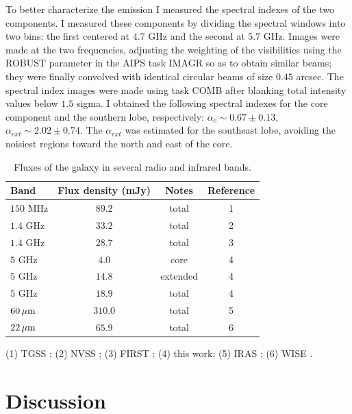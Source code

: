 \documentclass[../main.tex]{subfiles}
\begin{document}
To better characterize the emission I measured the spectral indexes of the two components.
I measured these components by dividing the spectral windows into two bins: the first centered at $4.7$ GHz and the second at $5.7$ GHz.
Images were made at the two frequencies, adjusting the weighting of the visibilities using the ROBUST parameter in the AIPS task IMAGR so as to obtain similar beams; they were finally convolved with identical circular beams of size $0.45$ arcsec. 
The spectral index images were made using task COMB after blanking total intensity values below $1.5$ sigma. 
I obtained the following spectral indexes for the core component and the southern lobe, respectively:  $\alpha_{c} \sim 0.67\pm0.13$,  $\alpha_{ext} \sim 2.02\pm0.74$. 
The $\alpha_{ext}$ was estimated for the southeast lobe, avoiding the noisiest regions toward the north and east of the core.


\begin{table}
\centering
  \begin{threeparttable}
\caption{Fluxes of the galaxy in several radio and infrared bands.}
\label{tab:flux}
\begin{tabular}{lccc}
\hline
Band&Flux density (mJy) &Notes &Reference\\
\hline
$150$ MHz&$89.2$&total&1\\
$1.4$ GHz&$33.2$&total&2\\
$1.4$ GHz&$28.7$&total&3\\
$5$ GHz&$4.0$ & core&4\\
$5$ GHz&$14.8$ & extended&4\\
$5$ GHz&$18.9$ & total&4\\
$60{\,\rm \mu m}$& $310.0$& total &5\\
$22{\,\rm \mu m}$& $65.9$ & total& 6\\
\hline
\end{tabular}
\begin{tablenotes}
\item (1) TGSS \citep{Intema17}; (2) NVSS \citep{Condon98}; (3) FIRST \citep{Becker95}; (4) this work; (5) IRAS \citep{Moshir90}; (6) WISE \citep{Wright10}.
\end{tablenotes}
\end{threeparttable}
\end{table}

\section{Discussion}
\label{sec:discussion}
\end{document}
